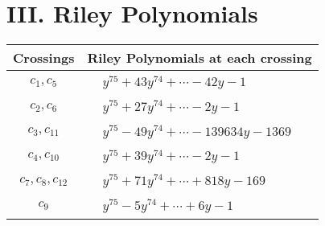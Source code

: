 \documentclass[1p]{elsarticle_modified}
\theoremstyle{definition}
\begin{document}
\centering \section*{ III. Riley Polynomials}
\begin{tabular}{m{50pt}|m{274pt}}
Crossings & \hspace{64pt}Riley Polynomials at each crossing \\
\hline $$\begin{aligned}c_{1},c_{5}\end{aligned}$$&$\begin{aligned}
&y^{75}+43 y^{74}+\cdots-42 y-1
\end{aligned}$\\
\hline $$\begin{aligned}c_{2},c_{6}\end{aligned}$$&$\begin{aligned}
&y^{75}+27 y^{74}+\cdots-2 y-1
\end{aligned}$\\
\hline $$\begin{aligned}c_{3},c_{11}\end{aligned}$$&$\begin{aligned}
&y^{75}-49 y^{74}+\cdots-139634 y-1369
\end{aligned}$\\
\hline $$\begin{aligned}c_{4},c_{10}\end{aligned}$$&$\begin{aligned}
&y^{75}+39 y^{74}+\cdots-2 y-1
\end{aligned}$\\
\hline $$\begin{aligned}c_{7},c_{8},c_{12}\end{aligned}$$&$\begin{aligned}
&y^{75}+71 y^{74}+\cdots+818 y-169
\end{aligned}$\\
\hline $$\begin{aligned}c_{9}\end{aligned}$$&$\begin{aligned}
&y^{75}-5 y^{74}+\cdots+6 y-1
\end{aligned}$\\
\hline
\end{tabular}
\vskip 2pc
\end{document}
